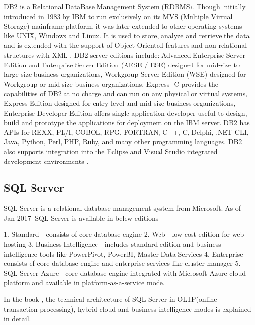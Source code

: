      DB2 is a Relational DataBase Management System (RDBMS). Though
     initially introduced in 1983 by IBM to run exclusively on its MVS
     (Multiple Virtual Storage) mainframe platform, it was later
     extended to other operating systems like UNIX, Windows and
     Linux. It is used to store, analyze and retrieve the data and is
     extended with the support of Object-Oriented features and
     non-relational structures with XML \cite{www-DB2Intro}. DB2
     server editions include: Advanced Enterprise Server Edition and
     Enterprise Server Edition (AESE / ESE) designed for mid-size to
     large-size business organizations, Workgroup Server Edition (WSE)
     designed for Workgroup or mid-size business organizations,
     Express -C provides the capabilities of DB2 at no charge and can
     run on any physical or virtual systems, Express Edition designed
     for entry level and mid-size business organizations, Enterprise
     Developer Edition offers single application developer useful to
     design, build and prototype the applications for deployment on
     the IBM server. DB2 has APIs for REXX, PL/I, COBOL, RPG, FORTRAN,
     C++, C, Delphi, .NET CLI, Java, Python, Perl, PHP, Ruby, and many
     other programming languages. DB2 also supports integration into
     the Eclipse and Visual Studio integrated development environments
     \cite{www-DB2Wiki}.

\subsection{ SQL Server}

     SQL Server \cite{www-sqlserver-wiki} is a relational database
     management system from Microsoft. As of Jan 2017, SQL Server is
     available in below editions

     1. Standard - consists of core database engine
     2. Web - low cost edition for web hosting
     3. Business Intelligence - includes standard edition and business
        intelligence tools like PowerPivot, PowerBI, Master Data Services
     4. Enterprise - consists of core database engine and enterprise services
        like cluster manager
     5. SQL Server Azure - \cite{www-azuresql} core database engine
        integrated with Microsoft Azure cloud platform and available in
        platform-as-a-service mode.

     In the book \cite{book-sqlserver}, the technical architecture of
     SQL Server in OLTP(online transaction processing), hybrid cloud
     and business intelligence modes is explained in detail.



